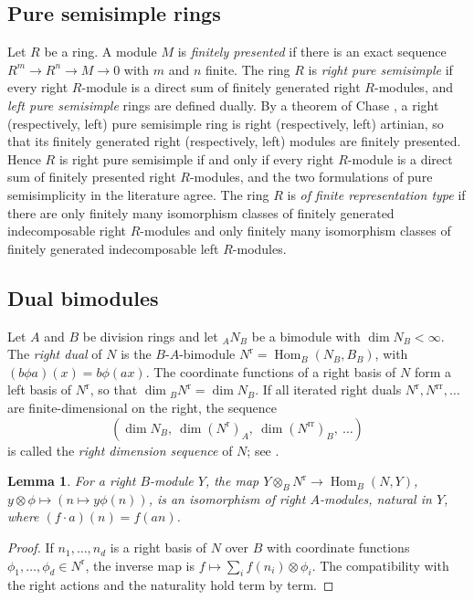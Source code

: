 \documentclass[11pt,a4paper]{amsart}
\newtheorem{lemma}[theorem]{Lemma}
\numberwithin{equation}{section}
\newcommand{\Hom}{\operatorname{Hom}}
\newcommand{\rr}{\mathrm{r}}
\begin{document}
\subsection{Pure semisimple rings}

Let $R$ be a ring. A module $M$ is \emph{finitely presented} if there is an exact sequence $R^m\to R^n\to M\to0$ with $m$ and $n$ finite. The ring $R$ is \emph{right pure semisimple} if every right $R$-module is a direct sum of finitely generated right $R$-modules, and \emph{left pure semisimple} rings are defined dually. By a theorem of Chase \cite{Ch}, a right (respectively, left) pure semisimple ring is right (respectively, left) artinian, so that its finitely generated right (respectively, left) modules are finitely presented. Hence $R$ is right pure semisimple if and only if every right $R$-module is a direct sum of finitely presented right $R$-modules, and the two formulations of pure semisimplicity in the literature agree. The ring $R$ is \emph{of finite representation type} if there are only finitely many isomorphism classes of finitely generated indecomposable right $R$-modules and only finitely many isomorphism classes of finitely generated indecomposable left $R$-modules.

\subsection{Dual bimodules}

Let $A$ and $B$ be division rings and let ${}_AN_B$ be a bimodule with $\dim N_B<\infty$. The \emph{right dual} of $N$ is the $B$-$A$-bimodule $N^{\rr}=\Hom_B(N_B,B_B)$, with $(b\phi a)(x)=b\phi(ax)$. The coordinate functions of a right basis of $N$ form a left basis of $N^{\rr}$, so that $\dim{}_BN^{\rr}=\dim N_B$. If all iterated right duals $N^{\rr},N^{\rr\rr},\dots$ are finite-dimensional on the right, the sequence
\[
(\dim N_B,\ \dim(N^{\rr})_A,\ \dim(N^{\rr\rr})_B,\ \dots)
\]
is called the \emph{right dimension sequence} of $N$; see \cite{Si97,Sa}.

\begin{lemma}\label{lem:adj}
For a right $B$-module $Y$, the map $Y\otimes_BN^{\rr}\to\Hom_B(N,Y)$, $y\otimes\phi\mapsto(n\mapsto y\phi(n))$, is an isomorphism of right $A$-modules, natural in $Y$, where $(f\cdot a)(n)=f(an)$.
\end{lemma}

\begin{proof}
If $n_1,\dots,n_d$ is a right basis of $N$ over $B$ with coordinate functions $\phi_1,\dots,\phi_d\in N^{\rr}$, the inverse map is $f\mapsto\sum_if(n_i)\otimes\phi_i$. The compatibility with the right actions and the naturality hold term by term.
\end{proof}
\end{document}
